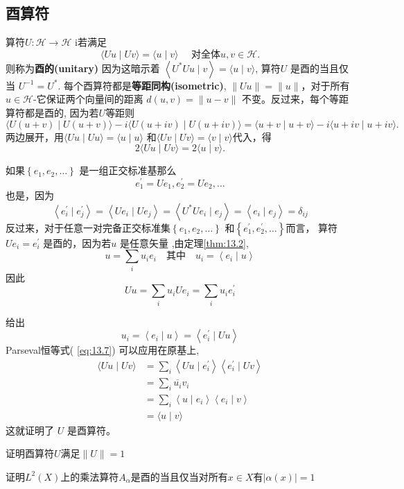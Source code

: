 \subsection{酉算符}
算符$U: \mathcal{H} \rightarrow \mathcal{H}$ i若满足
$$
\langle U u \mid U v\rangle=\langle u \mid v\rangle \quad \text { 对全体} u, v \in \mathcal{H} .
$$
则称为\textbf{酉的(unitary)}
因为这暗示着 $\left\langle U^{*} U u \mid v\right\rangle=\langle u \mid v\rangle$, 算符$U$ 是酉的当且仅当 $U^{-1}=U^{*}$. 每个酉算符都是\textbf{等距同构(isometric)}, $\|U u\|=\|u\|$，对于所有 $u \in \mathcal{H}$-它保证两个向量间的距离 $d(u, v)=\|u-v\|$ 不变。反过来，每个等距算符都是酉的, 因为若$U$等距则
$$
\langle U(u+v) \mid U(u+v)\rangle-i\langle U(u+i v) \mid U(u+i v)\rangle=\langle u+v \mid u+v\rangle-i\langle u+i v \mid u+i v\rangle .
$$
两边展开，用$\langle U u \mid U u\rangle=\langle u \mid u\rangle$ 和$\langle U v \mid U v\rangle=\langle v \mid v\rangle$代入，得
$$
2\langle U u \mid U v\rangle=2\langle u \mid v\rangle .
$$

如果$\left\{e_{1}, e_{2}, \ldots\right\}$ 是一组正交标准基那么
$$
e_{1}^{\prime}=U e_{1}, e_{2}^{\prime}=U e_{2}, \ldots
$$
也是，因为
$$
\left\langle e_{i}^{\prime} \mid e_{j}^{\prime}\right\rangle=\left\langle U e_{i} \mid U e_{j}\right\rangle=\left\langle U^{*} U e_{i} \mid e_{j}\right\rangle=\left\langle e_{i} \mid e_{j}\right\rangle=\delta_{i j}
$$
反过来，对于任意一对完备正交标准集$\left\{e_{1}, e_{2}, \ldots\right\}$ 和$\left\{e_{1}^{\prime}, e_{2}^{\prime}, \ldots\right\}$而言， 算符 $U e_{i}=e_{i}^{\prime}$ 是酉的，因为若$u$ 是任意矢量 ,由定理\ref{thm:13.2},
$$
u=\sum_{i} u_{i} e_{i} \quad \text {其中} \quad u_{i}=\left\langle e_{i} \mid u\right\rangle
$$
因此
$$
U u=\sum_{i} u_{i} U e_{i}=\sum_{i} u_{i} e_{i}^{\prime}
$$

给出
$$
u_{i}=\left\langle e_{i} \mid u\right\rangle=\left\langle e_{i}^{\prime} \mid U u\right\rangle
$$
Parseval恒等式( \ref{eq:13.7}) 可以应用在原基上,
$$
\begin{aligned}
\langle U u \mid U v\rangle &=\sum_{i}\left\langle U u \mid e_{i}^{\prime}\right\rangle\left\langle e_{i}^{\prime} \mid U v\right\rangle \\
&=\sum_{i} \overline{u_{i}} v_{i} \\
&=\sum_{i}\left\langle u \mid e_{i}\right\rangle\left\langle e_{i} \mid v\right\rangle \\
&=\langle u \mid v\rangle
\end{aligned}
$$
这就证明了 $U$ 是酉算符。
\begin{exercise}
    证明酉算符\(U\)满足\(\|U\|=1\)
\end{exercise}
\begin{exercise}
    证明\(L^2(X)\)上的乘法算符\(A_\alpha\)是酉的当且仅当对所有\(x\in X \)有\(|\alpha(x)|=1\)
\end{exercise}
